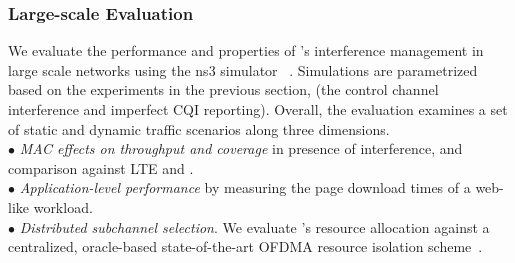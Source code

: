 
\subsubsection{Large-scale Evaluation}
\label{sec:eval}

We evaluate the performance and properties of \cf 's interference management in large scale networks using the ns3 simulator ~\cite{ns3url}. 
Simulations are parametrized based on the experiments in the previous section, (the control channel interference and imperfect CQI reporting).
Overall, the evaluation examines a set of static and dynamic traffic scenarios along three dimensions.\\[2pt]
\noindent $\bullet$ \emph{MAC effects on throughput and coverage} in presence of interference, and comparison against LTE and \wf. \\[2pt]
\noindent $\bullet$ \emph{Application-level performance} by measuring the page download times of a web-like workload. \\[2pt]
\noindent $\bullet$ \emph{Distributed subchannel selection}. We evaluate \cf's resource allocation 
against a centralized, oracle-based state-of-the-art OFDMA resource isolation scheme~\cite{fermi}.\\


